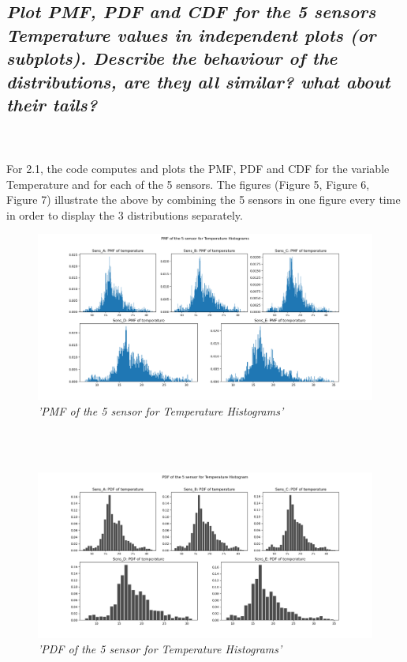 \documentclass[a4paper,12pt]{article} %
\begin{document}
\subsection{\it Plot PMF, PDF and CDF for the 5 sensors Temperature values in independent plots (or subplots). Describe the behaviour of the distributions, are they all similar? what about their tails?}
\\\\
For 2.1, the code computes and plots the PMF, PDF and 
CDF for the variable Temperature and for each of the 5 sensors. 
The figures (Figure 5, Figure 6, Figure 7) illustrate the above by combining the 5 sensors
in one figure every time in order to display the 3 distributions separately.
\\
\begin{figure}[H]
\centering
\includegraphics[width=\textwidth]{Graphs/PMF_of_the_5_sensor_-_Temperature_Histogram.png}
\caption{\it'PMF of the 5 sensor for Temperature Histograms'}
\end{figure}
\\\\
\begin{figure}[H]
\centering
\includegraphics[width=\textwidth]{Graphs/PDF_of_the_5_sensor_-_Temperature_Histogram.png}
\caption{\it'PDF of the 5 sensor for Temperature Histograms'}
\end{figure}
\end{document}
